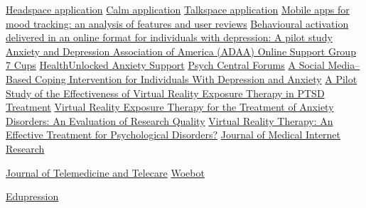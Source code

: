 \documentclass[a4paper]{article}
\begin{document}
\renewcommand{\refname}{Literatura}
\begin{thebibliography}{Literatura}
        \href{https://www.headspace.com/}{Headspace application}
        \href{https://www.calm.com/}{Calm application}
        \href{https://www.talkspace.com/}{Talkspace application}
        \href{https://www.ncbi.nlm.nih.gov/pmc/articles/PMC5977660/}{Mobile apps for mood tracking: an analysis of features and user reviews}
        \href{https://www.ncbi.nlm.nih.gov/pmc/articles/PMC10251223/}{Behavioural activation delivered in an online format for individuals with depression: A pilot study}
        \href{https://adaa.org/find-help/support}{Anxiety and Depression Association of America (ADAA) Online Support Group}
        \href{https://www.7cups.com/}{7 Cups}
        \href{https://www.betterhelp.com/drucilla-williams/get-started/?counselor=131482&start=true&landing_type=specialty&specialty_type=stress+and+anxiety&utm_source=AdWords&utm_campaign=storefront&utm_term=anxiety+counseling_b&utm_content=drucilla-williams_131482&gclid=Cj0KCQjw7aqkBhDPARIsAKGa0oLAGT0P_RltLBbccYrieUOmWKwsyWbuSUHuiKKyMjq16V6VzOb_92kaAg4ZEALw_wcB&not_found=1&gor=rd_drucilla-williams&not_found=1}{HealthUnlocked Anxiety Support}
        \href{https://mysupportforums.org/}{Psych Central Forums}
        \href{https://www.ncbi.nlm.nih.gov/pmc/articles/PMC8749346/}{A Social Media–Based Coping Intervention for Individuals With Depression and Anxiety}
        \href{https://journals.plos.org/plosone/article?id=10.1371/journal.pone.0226937}{A Pilot Study of the Effectiveness of Virtual Reality Exposure Therapy in PTSD Treatment}
        \href{https://www.sciencedirect.com/science/article/abs/pii/S0887618514000723}{Virtual Reality Exposure Therapy for the Treatment of Anxiety Disorders: An Evaluation of Research Quality}
        \href{https://psycnet.apa.org/record/1998-07498-003}{Virtual Reality Therapy: An Effective Treatment for Psychological Disorders?}
        \href{https://www.jmir.org/}{Journal of Medical Internet Research}

        \href{https://journals.sagepub.com/home/jtt}{Journal of Telemedicine and Telecare}
        \href{https://woebothealth.com/}{Woebot}

        \href{https://edupression.com/}{Edupression}
    
\end{thebibliography}
\end{document}
